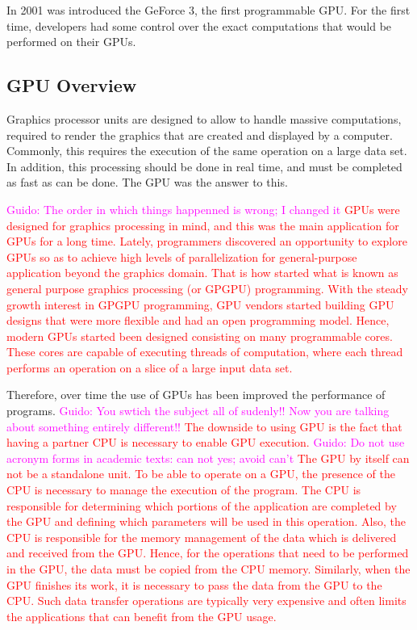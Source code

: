 \documentclass[Ingles]{ic-tese-v1}
\newcommand{\guido}[1]{\noindent\textcolor{magenta}{Guido: {#1}}}
\newcommand{\ed}[1]{\noindent\textcolor{red}{ {#1}}}
\newcommand{\guido}[1]{}
\newcommand{\ed}[1]{}
\begin{document}
In 2001 was introduced the GeForce 3, the first programmable GPU. 
For the first time, developers had some control over the exact computations
that would be performed on their GPUs.

\subsection{GPU Overview}
Graphics processor units are designed to allow to handle massive computations,
required to render the graphics that are created and displayed by a computer.
Commonly, this requires the execution of the same operation on a large data set. 
In addition, this processing should be done in real time, and must be completed as
fast as can be done. The GPU was the answer to this.

\guido{The order in which things happenned is wrong; I changed it}
\ed{GPUs were designed for graphics processing in mind, and this was the main application 
for GPUs for a long time. Lately, programmers discovered an opportunity
to explore GPUs so as to achieve high levels of parallelization for general-purpose 
application beyond the graphics domain.  That is how started 
what is known as general purpose graphics processing (or GPGPU) programming.
With the steady growth interest in GPGPU programming, GPU vendors
started building GPU designs that were more flexible and had an open 
programming model. Hence,  modern GPUs started been designed  consisting on many 
programmable cores. These cores are capable of executing 
threads of computation, where each thread performs an operation on a slice of 
a large  input data set. }

Therefore, over time the use of GPUs has been improved the performance of programs. 
\guido{You swtich the subject all of sudenly!! Now you are talking about something entirely different!!}
\ed{The downside to using GPU is
the fact that having a partner CPU is necessary to enable GPU execution. 
\guido{Do not use acronym forms in academic texts: can not yes; avoid can't }
The GPU by itself can not be a standalone unit. To be able to operate on a GPU, the presence of the CPU is
necessary to manage the execution of the program. The CPU is responsible for
determining which portions of the application are completed by the GPU and defining which
parameters will be used in this operation. Also, 
the CPU is responsible for the memory management of the data which is
delivered and received from the GPU. Hence, for  the
operations that need to be performed in the GPU, the data must be copied from the CPU
memory. Similarly, when the GPU finishes its work, it is necessary to pass
the data from the GPU to the CPU. Such data transfer operations are typically  very expensive 
and often limits the applications that can benefit from the GPU usage.}
\end{document}
